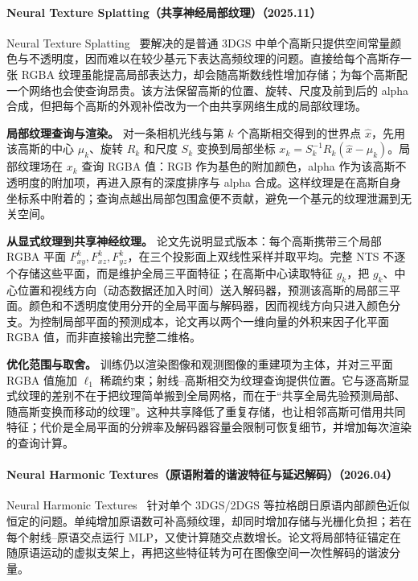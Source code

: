 \paragraph{Neural Texture Splatting（共享神经局部纹理）（2025.11）}
Neural Texture Splatting~\cite{2511_18873} 要解决的是普通 3DGS 中单个高斯只提供空间常量颜色与不透明度，因而难以在较少基元下表达高频纹理的问题。直接给每个高斯存一张 RGBA 纹理虽能提高局部表达力，却会随高斯数线性增加存储；为每个高斯配一个网络也会使查询昂贵。该方法保留高斯的位置、旋转、尺度及前到后的 alpha 合成，但把每个高斯的外观补偿改为一个由共享网络生成的局部纹理场。

\textbf{局部纹理查询与渲染。} 对一条相机光线与第 $k$ 个高斯相交得到的世界点 $\hat{x}$，先用该高斯的中心 $\mu_k$、旋转 $R_k$ 和尺度 $S_k$ 变换到局部坐标 $x_k=S_k^{-1}R_k(\hat{x}-\mu_k)$。局部纹理场在 $x_k$ 查询 RGBA 值：RGB 作为基色的附加颜色，alpha 作为该高斯不透明度的附加项，再进入原有的深度排序与 alpha 合成。这样纹理是在高斯自身坐标系中附着的；查询点越出局部包围盒便不贡献，避免一个基元的纹理泄漏到无关空间。

\textbf{从显式纹理到共享神经纹理。} 论文先说明显式版本：每个高斯携带三个局部 RGBA 平面 $F_{xy}^k,F_{xz}^k,F_{yz}^k$，在三个投影面上双线性采样并取平均。完整 NTS 不逐个存储这些平面，而是维护全局三平面特征；在高斯中心读取特征 $g_k$，把 $g_k$、中心位置和视线方向（动态数据还加入时间）送入解码器，预测该高斯的局部三平面。颜色和不透明度使用分开的全局平面与解码器，因而视线方向只进入颜色分支。为控制局部平面的预测成本，论文再以两个一维向量的外积来因子化平面 RGBA 值，而非直接输出完整二维格。

\textbf{优化范围与取舍。} 训练仍以渲染图像和观测图像的重建项为主体，并对三平面 RGBA 值施加 $\ell_1$ 稀疏约束；射线--高斯相交为纹理查询提供位置。它与逐高斯显式纹理的差别不在于把纹理简单搬到全局网格，而在于“共享全局先验预测局部、随高斯变换而移动的纹理”。这种共享降低了重复存储，也让相邻高斯可借用共同特征；代价是全局平面的分辨率及解码器容量会限制可恢复细节，并增加每次渲染的查询计算。

\paragraph{Neural Harmonic Textures（原语附着的谐波特征与延迟解码）（2026.04）}
Neural Harmonic Textures~\cite{2604_01204} 针对单个 3DGS/2DGS 等拉格朗日原语内部颜色近似恒定的问题。单纯增加原语数可补高频纹理，却同时增加存储与光栅化负担；若在每个射线--原语交点运行 MLP，又使计算随交点数增长。论文将局部特征锚定在随原语运动的虚拟支架上，再把这些特征转为可在图像空间一次性解码的谐波分量。

